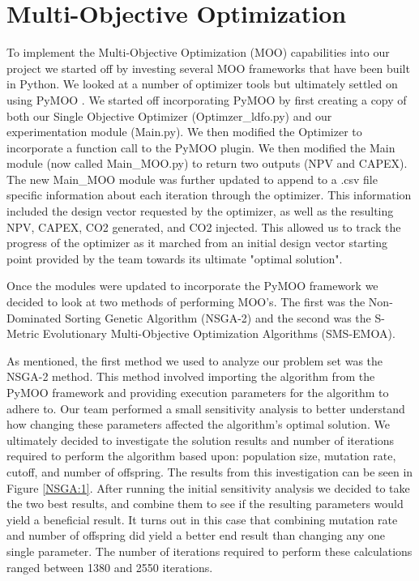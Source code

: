 \documentclass[balance,upint,subscriptcorrection,varvw,mathalfa=cal=boondoxo,spanish,french,vietnamese,russian,greek,pdf-a,colorlinks]{asmeconf}
\begin{document}
\section{Multi-Objective Optimization}
To implement the Multi-Objective Optimization (MOO) capabilities into our project we started off by investing several MOO frameworks that have been built in Python. We looked at a number of optimizer tools but ultimately settled on using PyMOO \cite{Blank2020}. We started off incorporating PyMOO by first creating a copy of both our Single Objective Optimizer (Optimzer_ldfo.py) and our experimentation module (Main.py). We then modified the Optimizer to incorporate a function call to the PyMOO plugin. We then modified the Main module (now called Main_MOO.py) to return two outputs (NPV and CAPEX). The new Main_MOO module was further updated to append to a .csv file specific information about each iteration through the optimizer. This information included the design vector requested by the optimizer, as well as the resulting NPV, CAPEX, CO2 generated, and CO2 injected. This allowed us to track the progress of the optimizer as it marched from an initial design vector starting point provided by the team towards its ultimate "optimal solution". 

Once the modules were updated to incorporate the PyMOO framework we decided to look at two methods of performing MOO's. The first was the Non-Dominated Sorting Genetic Algorithm (NSGA-2) and the second was the S-Metric Evolutionary Multi-Objective Optimization Algorithms (SMS-EMOA). 

As mentioned, the first method we used to analyze our problem set was the NSGA-2 method. This method involved importing the algorithm from the PyMOO framework and providing execution parameters for the algorithm to adhere to. Our team performed a small sensitivity analysis to better understand how changing these parameters affected the algorithm's optimal solution. We ultimately decided to investigate the solution results and number of iterations required to perform the algorithm based upon: population size, mutation rate, cutoff, and number of offspring. The results from this investigation can be seen in Figure \ref{NSGA:1}. After running the initial sensitivity analysis we decided to take the two best results, and combine them to see if the resulting parameters would yield a beneficial result. It turns out in this case that combining mutation rate and number of offspring did yield a better end result than changing any one single parameter. The number of iterations required to perform these calculations ranged between 1380 and 2550 iterations.
\end{document}
